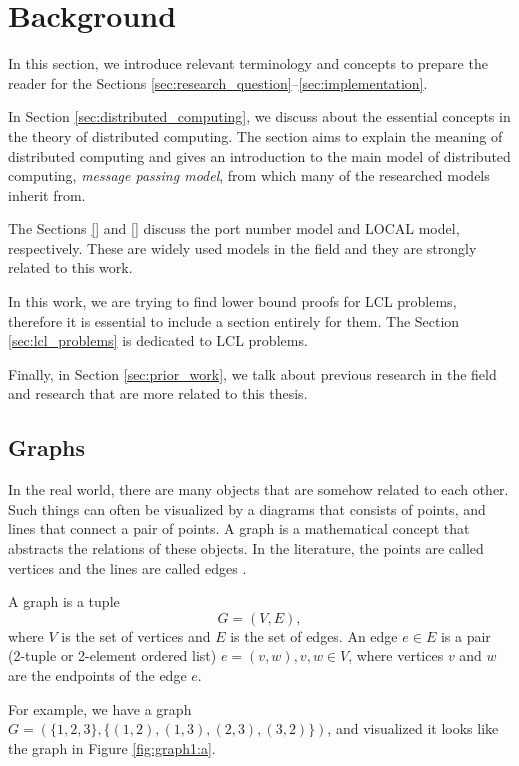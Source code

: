 
\section{Background} \label{sec:background}
In this section, we introduce relevant terminology and concepts to prepare the reader for the Sections \ref{sec:research_question}--\ref{sec:implementation}.


In Section \ref{sec:distributed_computing}, we discuss about the essential concepts in the theory of distributed computing.
The section aims to explain the meaning of distributed computing and gives an introduction to the main model of distributed computing, \emph{message passing model}, from which many of the researched models inherit from.

The Sections \ref{} and \ref{} discuss the port number model and LOCAL model, respectively.
These are widely used models in the field and they are strongly related to this work.

In this work, we are trying to find lower bound proofs for LCL problems, therefore it is essential to include a section entirely for them.
The Section \ref{sec:lcl_problems} is dedicated to LCL problems.

Finally, in Section \ref{sec:prior_work}, we talk about previous research in the field and research that are more related to this thesis.


\subsection{Graphs} \label{sec:graphs}
In the real world, there are many objects that are somehow related to each other.
Such things can often be visualized by a diagrams that consists of points, and lines that connect a pair of points.
A graph is a mathematical concept that abstracts the relations of these objects.
In the literature, the points are called vertices and the lines are called edges
\cite{DBLP:books/others/BondyM76}.

\begin{definition}
A graph is a tuple $$G = (V, E),$$ where $V$ is the set of vertices and $E$ is the set of edges.
An edge $e \in E$ is a pair (2-tuple or 2-element ordered list) $e=(v, w), v, w \in V$, where vertices $v$ and $w$ are the endpoints of the edge $e$.
\end{definition}
For example, we have a graph $G=(\{1, 2, 3\}, \{(1, 2),(1, 3),(2, 3),(3, 2)\})$, and visualized it looks like the graph in Figure \ref{fig:graph1:a}.

